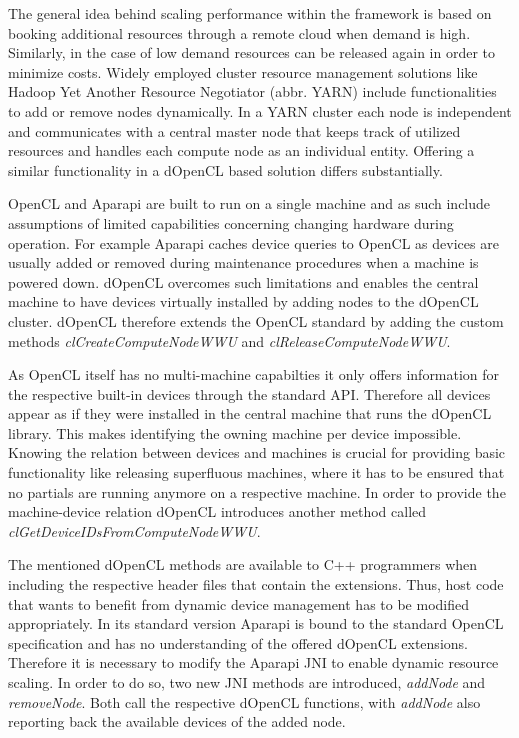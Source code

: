 The general idea behind scaling performance within the framework is based on booking additional resources through a remote cloud when demand is high. Similarly, in the case of low demand resources can be released again in order to minimize costs. Widely employed cluster resource management solutions like Hadoop Yet Another Resource Negotiator (abbr. YARN) include functionalities to add or remove nodes dynamically. In a YARN cluster each node is independent and communicates with a central master node that keeps track of utilized resources and handles each compute node as an individual entity. Offering a similar functionality in a dOpenCL based solution differs substantially.

OpenCL and Aparapi are built to run on a single machine and as such include assumptions of limited capabilities concerning changing hardware during operation. For example Aparapi caches device queries to OpenCL as devices are usually added or removed during maintenance procedures when a machine is powered down. dOpenCL overcomes such limitations and enables the central machine to have devices virtually installed by adding nodes to the dOpenCL cluster. dOpenCL therefore extends the OpenCL standard by adding the custom methods \textit{clCreateComputeNodeWWU} and \textit{clReleaseComputeNodeWWU}.

As OpenCL itself has no multi-machine capabilties it only offers information for the respective built-in devices through the standard API. Therefore all devices appear as if they were installed in the central machine that runs the dOpenCL library. This makes identifying the owning machine per device impossible. Knowing the relation between devices and machines is crucial for providing basic functionality like releasing superfluous machines, where it has to be ensured that no partials are running anymore on a respective machine. In order to provide the machine-device relation dOpenCL introduces another method called \textit{clGetDeviceIDsFromComputeNodeWWU}.

The mentioned dOpenCL methods are available to C++ programmers when including the respective header files that contain the extensions. Thus, host code that wants to benefit from dynamic device management has to be modified appropriately. In its standard version Aparapi is bound to the standard OpenCL specification and has no understanding of the offered dOpenCL extensions. Therefore it is necessary to modify the Aparapi JNI to enable dynamic resource scaling. In order to do so, two new JNI methods are introduced, \textit{addNode} and \textit{removeNode}. Both call the respective dOpenCL functions, with \textit{addNode} also reporting back the available devices of the added node.

